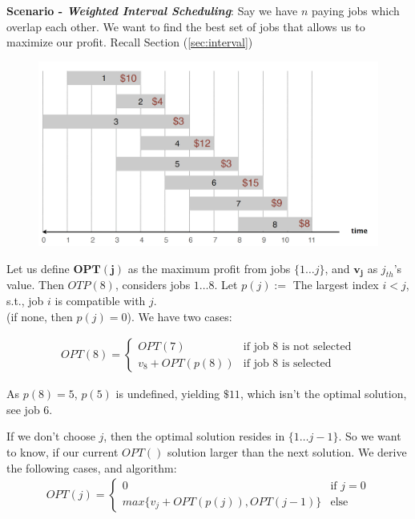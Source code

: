\newpage
\noindent
\textbf{Scenario - \textit{Weighted Interval Scheduling}}: Say we have $n$ paying jobs which overlap each other.
We want to find the best set of jobs that allows us to maximize our profit. Recall Section (\ref{sec:interval})

\begin{figure}[h]
\centering
\includegraphics[width=.7\textwidth]{Sections/dp/wis.png}
\end{figure}

\noindent
Let us define $\mathbf{OPT(j)}$ as the maximum profit from jobs $\{1\dots j\}$, and $\mathbf{v_j}$ as $j_{th}$'s value. Then $OTP(8)$, considers jobs $1\dots 8$. Let $p(j):=$ The largest index $i < j$, s.t., job $i$ is compatible with $j$.\\
(if none, then $p(j) = 0$). We have two cases: 

\vspace{-1em}
\begin{align*}
    OPT(8) =
    \begin{cases}
        OPT(7) & \text{if job 8 is not selected}\\
        v_8 + OPT(p(8)) & \text{if job 8 is selected}
    \end{cases}
\end{align*}

\noindent
As $p(8)=5$, $p(5)$ is undefined, yielding $\$11$, which isn't the optimal solution, see job 6.

\noindent
If we don't choose $j$, then the optimal solution resides in $\{1\dots j-1\}$. So we want to know, 
if our current $OPT()$ solution larger than the next solution. We derive the following cases, and algorithm:
\begin{align*}
    OPT(j) =
    \begin{cases}
        0 & \text{if $j=0$}\\
        max\{v_j+OPT(p(j)), OPT(j-1)\} & \text{else}
    \end{cases}
\end{align*}

